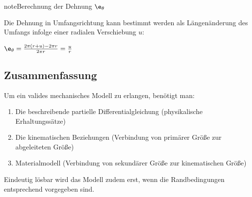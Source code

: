\documentclass[letterpaper,10pt,german]{jupyterBook}
\begin{document}
\begin{sphinxadmonition}{note}{Berechnung der Dehnung \protect\(\e_{\theta}\protect\)}

\sphinxAtStartPar
Die Dehnung in Umfangsrichtung kann bestimmt werden als Längenänderung des Umfangs infolge einer radialen Verschiebung \(u\):

\sphinxAtStartPar
\(
\e_{\theta} = \frac{2 \pi (r+u) -2\pi r}{2\pi r} = \frac{u}{r}
\)
\end{sphinxadmonition}


\subsection{Zusammenfassung}
\label{\detokenize{chapters/chapter1/elasticity:id6}}
\sphinxAtStartPar
Um ein valides mechanisches Modell zu erlangen, benötigt man:
\begin{enumerate}
%
\item {} 
\sphinxAtStartPar
Die beschreibende partielle Differentialgleichung (physikalische Erhaltungssätze)

\item {} 
\sphinxAtStartPar
Die kinematischen Beziehungen (Verbindung von primärer Größe zur abgeleiteten Größe)

\item {} 
\sphinxAtStartPar
Materialmodell (Verbindung von sekundärer Größe zur kinematischen Größe)

\end{enumerate}

\sphinxAtStartPar
Eindeutig lösbar wird das Modell zudem erst, wenn die Randbedingungen entsprechend vorgegeben sind.
\end{document}
